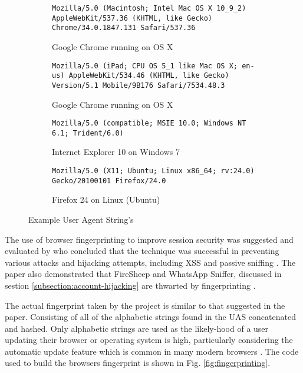 \begin{figure}
\centering
\begin{subfigure}[a]{\textwidth}
\centering
{\footnotesize \texttt{Mozilla/5.0 (Macintosh; Intel Mac OS X 10\_9\_2) AppleWebKit/537.36 (KHTML, like Gecko) Chrome/34.0.1847.131 Safari/537.36}}
\caption{Google Chrome running on OS X}
\label{fig:uasforchrome}
\end{subfigure}

\begin{subfigure}[b]{\textwidth}
\centering
{\footnotesize \texttt{Mozilla/5.0 (iPad; CPU OS 5\_1 like Mac OS X; en-us) AppleWebKit/534.46 (KHTML, like Gecko) Version/5.1 Mobile/9B176 Safari/7534.48.3}}
\caption{ Google Chrome running on OS X}
\end{subfigure}

\begin{subfigure}[c]{\textwidth}
\centering
{\footnotesize \texttt{Mozilla/5.0 (compatible; MSIE 10.0; Windows NT 6.1; Trident/6.0)}}
\caption{Internet Explorer 10 on Windows 7}
\end{subfigure}

\begin{subfigure}[d]{\textwidth}
\centering
{\footnotesize \texttt{Mozilla/5.0 (X11; Ubuntu; Linux x86\_64; rv:24.0) Gecko/20100101 Firefox/24.0}}
\caption{Firefox 24 on Linux (Ubuntu)}
\end{subfigure}

\caption{Example User Agent String's}
\label{fig:useragentstring}
\end{figure}

The use of browser fingerprinting to improve session security was suggested and evaluated by  who concluded that the technique was successful in preventing various attacks and hijacking attempts, including XSS and passive sniffing . The paper also demonstrated that FireSheep and WhatsApp Sniffer, discussed in sestion \ref{subsection:account-hijacking} are thwarted by fingerprinting \parencite{unger2013fingerprinting}.

The actual fingerprint taken by the project is similar to that suggested in the paper. Consisting of all of the alphabetic strings found in the UAS concatenated and hashed. Only alphabetic strings are used as the likely-hood of a user updating their browser or operating system is high, particularly considering the automatic update feature which is common in many modern browsers \parencite{google2014autoupdate, firefox2014autoupdate}. The code used to build the browsers fingerprint is shown in Fig. \ref{fig:fingerprinting}.


